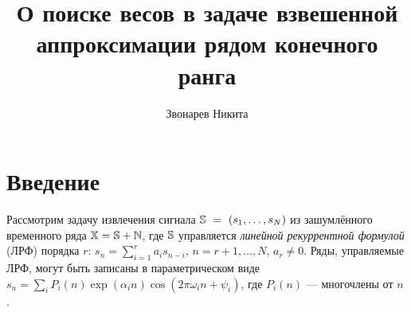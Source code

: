 \documentclass[10pt]{article}
\author{Звонарев Никита}
\title{О поиске весов в задаче взвешенной аппроксимации рядом конечного ранга}
\begin{document}
\maketitle

\section*{Введение}
Рассмотрим задачу извлечения сигнала $\mathbb{S}~=~(s_1, \ldots, s_N)$ из зашумлённого временного ряда $\mathbb{X} = \mathbb{S} + \mathbb{N}$, где $\mathbb{S}$ управляется \emph{линейной рекуррентной формулой} (ЛРФ) порядка $r$: $s_n = \sum_{i = 1}^{r} a_i s_{n-i}$, $n = r + 1, \ldots, N$, $a_r\neq 0$. Ряды, управляемые ЛРФ, могут быть записаны в параметрическом виде $s_n = \sum_i P_i(n) \exp(\alpha_i n) \cos(2 \pi \omega_i n + \psi_i)$, где $P_i(n)$ --- многочлены от $n$  \cite{Golyandina.etal2001}.
\end{document}
